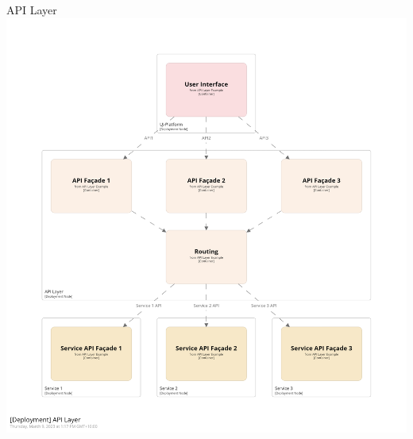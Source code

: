 \documentclass{slide}
\begin{document}
\begin{frame}{API Layer}
    \vspace{-7mm}
    \centering
    \includegraphics[trim=197 197 197 197,clip,height=0.98\textheight]{../../notes/service-based/diagrams/api-layer.png}
\end{frame}
\end{document}
